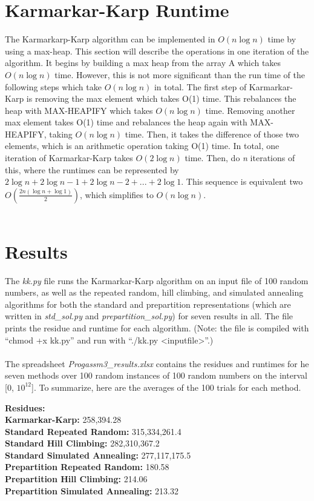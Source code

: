 \documentclass[11pt]{article}
\begin{document}
\section{\textbf{Karmarkar-Karp Runtime}}
The Karmarkarp-Karp algorithm can be implemented in $O(n\log n)$ time by using a max-heap. This section will describe the operations in one iteration of the algorithm. It begins by building a max heap from the array A which takes $O(n\log n)$ time. However, this is not more significant than the run time of the following steps which take $O(n\log n)$ in total. The first step of Karmarkar-Karp is removing the max element which takes O(1) time. This rebalances the heap with MAX-HEAPIFY which takes $O(n\log n)$ time. Removing another max element takes O(1) time and rebalances the heap again with MAX-HEAPIFY, taking $O(n\log n)$ time. Then, it takes the difference of those two elements, which is an arithmetic operation taking O(1) time. In total, one iteration of Karmarkar-Karp takes $O(2\log n)$ time. Then, do \textit{n} iterations of this, where the runtimes can be represented by $2\log n + 2\log{n -1} + 2\log{n-2} + ... + 2\log{1}$. This sequence is equivalent two $O(\frac{2n(\log{n} + \log{1})}{2})$, which simplifies to $O(n\log n)$.  \\\\

\section{\textbf{Results}}
The \textit{kk.py} file runs the Karmarkar-Karp algorithm on an input file of 100 random numbers, as well as the repeated random, hill climbing, and simulated annealing algorithms for both the standard and prepartition representations (which are written in \textit{std\_sol.py} and \textit{prepartition\_sol.py}) for seven results in all. The file prints the residue and runtime for each algorithm. (Note: the  file is compiled with “chmod +x kk.py” and run with “./kk.py <inputfile>”.) \\\\

The spreadsheet \textit{Progassm3\_results.xlsx} contains the residues and runtimes for he seven methods over 100 random instances of 100 random numbers on the interval [0, $10^12$]. To summarize, here are the averages of the 100 trials for each method.

\indent \textbf{Residues:}\\
\indent \indent \textbf{Karmarkar-Karp:} 258,394.28\\
\indent \indent \textbf{Standard Repeated Random:} 315,334,261.4\\
\indent \indent \textbf{Standard Hill Climbing:} 282,310,367.2\\
\indent \indent \textbf{Standard Simulated Annealing:} 277,117,175.5\\
\indent \indent \textbf{Prepartition Repeated Random:} 180.58\\
\indent \indent \textbf{Prepartition Hill Climbing:} 214.06\\
\indent \indent \textbf{Prepartition Simulated Annealing:} 213.32\\\\
\end{document}
